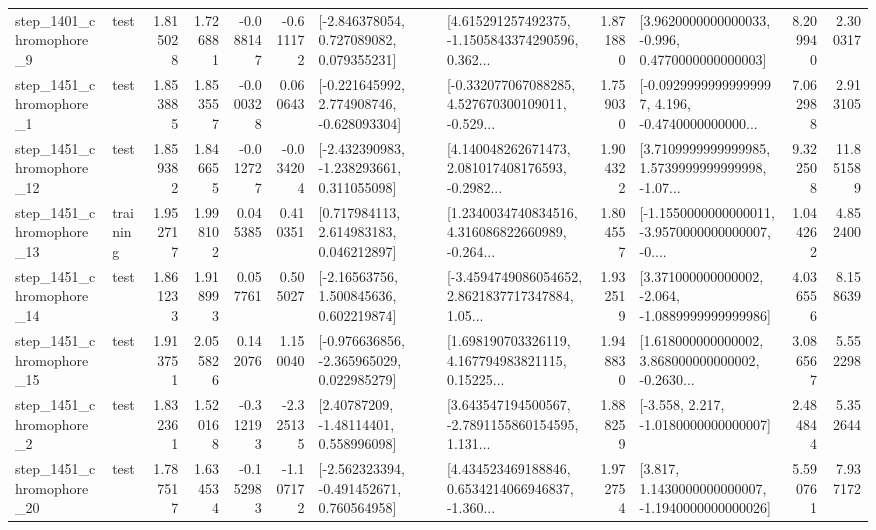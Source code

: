\begin{tabular}{llrrrrllrlrr}
  step\_1401\_chromophore\_9 &      test &      1.815028 &    1.726881 &     -0.088147 & -0.611172 &    [-2.846378054, 0.727089082, 0.079355231] &  [4.615291257492375, -1.1505843374290596, 0.362... &       1.871880 &   [3.9620000000000033, -0.996, 0.4770000000000003] &            8.209940 &          2.300317 \\
  step\_1451\_chromophore\_1 &      test &      1.853885 &    1.853557 &     -0.000328 &  0.060643 &   [-0.221645992, 2.774908746, -0.628093304] &  [-0.332077067088285, 4.527670300109011, -0.529... &       1.759030 &  [-0.09299999999999997, 4.196, -0.4740000000000... &            7.062988 &          2.913105 \\
 step\_1451\_chromophore\_12 &      test &      1.859382 &    1.846655 &     -0.012727 & -0.034204 &   [-2.432390983, -1.238293661, 0.311055098] &  [4.140048262671473, 2.081017408176593, -0.2982... &       1.904322 &  [3.7109999999999985, 1.5739999999999998, -1.07... &            9.322508 &         11.851589 \\
 step\_1451\_chromophore\_13 &  training &      1.952717 &    1.998102 &      0.045385 &  0.410351 &     [0.717984113, 2.614983183, 0.046212897] &  [1.2340034740834516, 4.316086822660989, -0.264... &       1.804557 &  [-1.1550000000000011, -3.9570000000000007, -0.... &            1.044262 &          4.852400 \\
 step\_1451\_chromophore\_14 &      test &      1.861233 &    1.918993 &      0.057761 &  0.505027 &     [-2.16563756, 1.500845636, 0.602219874] &  [-3.4594749086054652, 2.8621837717347884, 1.05... &       1.932519 &   [3.371000000000002, -2.064, -1.0889999999999986] &            4.036556 &          8.158639 \\
 step\_1451\_chromophore\_15 &      test &      1.913751 &    2.055826 &      0.142076 &  1.150040 &   [-0.976636856, -2.365965029, 0.022985279] &  [1.698190703326119, 4.167794983821115, 0.15225... &       1.948830 &  [1.618000000000002, 3.868000000000002, -0.2630... &            3.086567 &          5.552298 \\
  step\_1451\_chromophore\_2 &      test &      1.832361 &    1.520168 &     -0.312193 & -2.325135 &      [2.40787209, -1.48114401, 0.558996098] &  [3.643547194500567, -2.7891155860154595, 1.131... &       1.888259 &               [-3.558, 2.217, -1.0180000000000007] &            2.484844 &          5.352644 \\
 step\_1451\_chromophore\_20 &      test &      1.787517 &    1.634534 &     -0.152983 & -1.107172 &   [-2.562323394, -0.491452671, 0.760564958] &  [4.434523469188846, 0.6534214066946837, -1.360... &       1.972754 &   [3.817, 1.1430000000000007, -1.1940000000000026] &            5.590761 &          7.937172 \\

\end{tabular}
